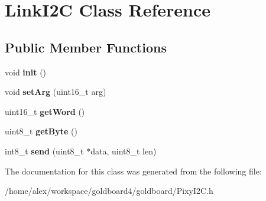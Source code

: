 \hypertarget{class_link_i2_c}{}\section{Link\+I2C Class Reference}
\label{class_link_i2_c}
\subsection*{Public Member Functions}
\begin{DoxyCompactItemize}
\item 
void {\bfseries init} ()\hypertarget{class_link_i2_c_a88bb723d5558bdc9011d383ec6ead785}{}\label{class_link_i2_c_a88bb723d5558bdc9011d383ec6ead785}

\item 
void {\bfseries set\+Arg} (uint16\+\_\+t arg)\hypertarget{class_link_i2_c_a5f15394cf091ad6f209a64cf0f0db7ae}{}\label{class_link_i2_c_a5f15394cf091ad6f209a64cf0f0db7ae}

\item 
uint16\+\_\+t {\bfseries get\+Word} ()\hypertarget{class_link_i2_c_a7f0d784f6aea082e92392b86aa26e137}{}\label{class_link_i2_c_a7f0d784f6aea082e92392b86aa26e137}

\item 
uint8\+\_\+t {\bfseries get\+Byte} ()\hypertarget{class_link_i2_c_a13520ec81c6b8d2fb5dd443b35cbb778}{}\label{class_link_i2_c_a13520ec81c6b8d2fb5dd443b35cbb778}

\item 
int8\+\_\+t {\bfseries send} (uint8\+\_\+t $\ast$data, uint8\+\_\+t len)\hypertarget{class_link_i2_c_ae7b12321ba087e83fe265ede5e84bc07}{}\label{class_link_i2_c_ae7b12321ba087e83fe265ede5e84bc07}

\end{DoxyCompactItemize}


The documentation for this class was generated from the following file\+:\begin{DoxyCompactItemize}
\item 
/home/alex/workspace/goldboard4/goldboard/Pixy\+I2\+C.\+h\end{DoxyCompactItemize}
